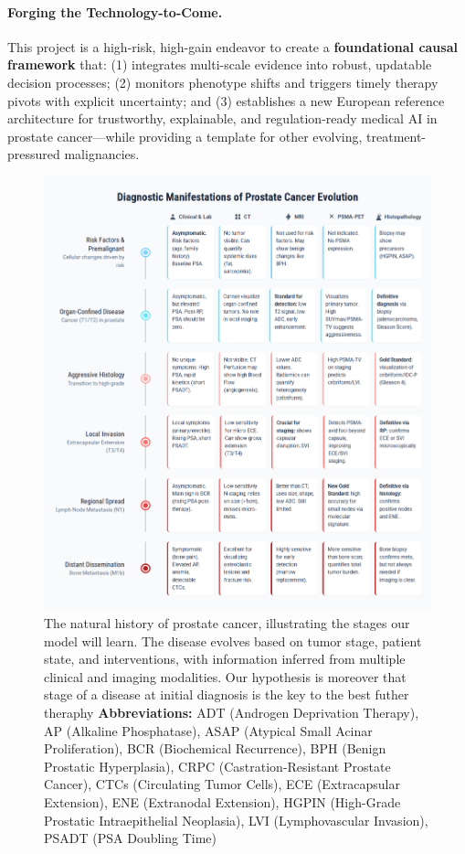 \documentclass[11pt, a4paper]{article}
\begin{document}
\paragraph{Forging the Technology-to-Come.} This project is a high-risk, high-gain endeavor to create a \textbf{foundational causal framework} that: (1) integrates multi-scale evidence into robust, updatable decision processes; (2) monitors phenotype shifts and triggers timely therapy pivots with explicit uncertainty; and (3) establishes a new European reference architecture for trustworthy, explainable, and regulation-ready medical AI in prostate cancer—while providing a template for other evolving, treatment-pressured malignancies.



\begin{figure}[H]
    \centering
    \includegraphics[width=\textwidth]{pe.png}
    \caption{The natural history of prostate cancer, illustrating the stages our model will learn. The disease evolves based on tumor stage, patient state, and interventions, with information inferred from multiple clinical and imaging modalities. Our hypothesis is moreover that stage of a disease at initial diagnosis is the key to the best futher theraphy \textbf{Abbreviations:} ADT (Androgen Deprivation Therapy), AP (Alkaline Phosphatase), ASAP (Atypical Small Acinar Proliferation), BCR (Biochemical Recurrence), BPH (Benign Prostatic Hyperplasia), CRPC (Castration-Resistant Prostate Cancer), CTCs (Circulating Tumor Cells), ECE (Extracapsular Extension), ENE (Extranodal Extension), HGPIN (High-Grade Prostatic Intraepithelial Neoplasia), LVI (Lymphovascular Invasion), PSADT (PSA Doubling Time)}
    \label{fig:prostate_evolution}
\end{figure}
\end{document}
